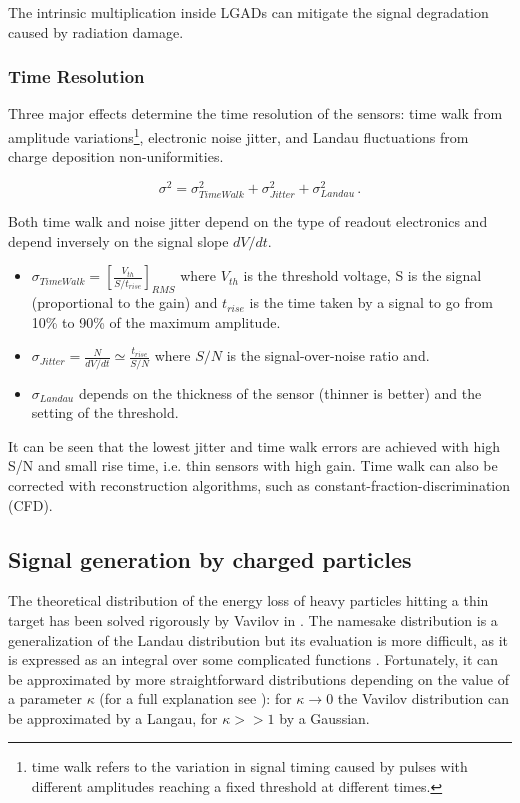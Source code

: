 The intrinsic multiplication inside LGADs can mitigate the signal degradation caused by radiation damage.

\subsubsection{Time Resolution}

Three major effects determine the time resolution of the sensors: time walk from amplitude variations\footnote{time walk refers to the variation in signal timing caused by pulses with different amplitudes reaching a fixed threshold at different times.}, electronic noise jitter, and Landau fluctuations from charge deposition non-uniformities.

\begin{equation}\label{eq:time_resoltuion_LGADs}
    \sigma^2 = \sigma_{TimeWalk}^2 + \sigma_{Jitter}^2 + \sigma_{Landau}^2  \, .
\end{equation}

 Both time walk and noise jitter depend on the type of readout electronics and depend inversely on the signal slope $dV/dt$.

\begin{itemize}
    \item $\sigma_{TimeWalk} = \left[ \frac{V_{th}}{S/t_{rise}}\right]_{RMS}$ where $V_{th}$ is the threshold voltage, S is the signal (proportional to the gain) and $t_{rise}$ is the time taken by a signal to go from 10\% to 90\% of the maximum amplitude.
    \item $\sigma_{Jitter} = \frac{N}{dV/dt} \simeq \frac{t_{rise}}{S/N}$ where $S/N$ is the signal-over-noise ratio and.
    \item $\sigma_{Landau}$ depends on the thickness of the sensor (thinner is better) and the setting of the threshold.
\end{itemize}

It can be seen that the lowest jitter and time walk errors are achieved with high S/N and small rise time, i.e. thin sensors with high gain. Time walk can also be corrected with reconstruction algorithms, such as constant-fraction-discrimination (CFD).

\subsection{Signal generation by charged particles}

The theoretical distribution of the energy loss of heavy particles hitting a thin target has been solved rigorously by Vavilov in \cite{vavilov_1957}. The namesake distribution is a generalization of the Landau distribution but its evaluation is more difficult, as it is expressed as an integral over some complicated functions \cite[Eq.(4)]{vavilov_1957}. Fortunately, it can be approximated by more straightforward distributions depending on the value of a parameter $\kappa$ (for a full explanation see ): for $\kappa\rightarrow0$ the Vavilov distribution can be approximated by a Langau, for $\kappa>>1$ by a Gaussian.

